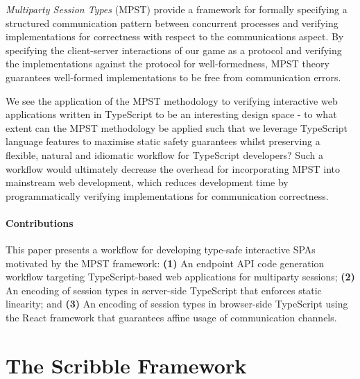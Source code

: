 \documentclass[submission,copyright,creativecommons]{eptcs}
\newcommand{\sectionref}[1]{\textsection~\ref{#1}}
\begin{document}
\textit{Multiparty Session Types} (MPST) \cite{MPST} provide a framework for formally specifying a structured communication pattern between concurrent processes and verifying implementations for correctness with respect to the communications aspect. By specifying the client-server interactions of our game as a protocol and verifying the implementations against the protocol for well-formedness, MPST theory guarantees well-formed implementations to be free from communication errors.

We see the application of the MPST methodology to verifying interactive web applications written in TypeScript to be an interesting design space - to what extent can the MPST methodology be applied such that we leverage TypeScript language features to maximise static safety guarantees whilst preserving a flexible, natural and idiomatic workflow for TypeScript developers? Such a workflow would ultimately decrease the overhead for incorporating MPST into mainstream web development, which reduces development time by programmatically verifying implementations for communication correctness.

\paragraph{Contributions}
This paper presents a workflow for developing type-safe interactive SPAs motivated by the MPST framework: \textbf{(1)} An endpoint API code generation workflow targeting TypeScript-based web applications for multiparty sessions; \textbf{(2)} An encoding of session types in server-side TypeScript that enforces static linearity; and \textbf{(3)} An encoding of session types in browser-side TypeScript using the React framework that guarantees affine usage of communication channels.


\section{The Scribble Framework}
\label{section:scribble}
\end{document}
